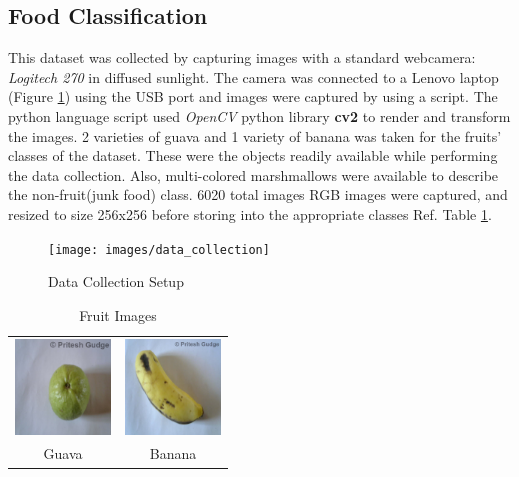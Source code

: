 \documentclass[10pt,journal,compsoc]{IEEEtran}
\begin{document}
\subsection{Food Classification}
This dataset was collected by capturing images with a standard webcamera: \emph{Logitech 270} in diffused sunlight. The camera was connected to a Lenovo laptop (Figure \ref{fig:datacoll1}) using the USB port and images were captured by using a script\cite{capt_img_script}. The python language script used \emph{OpenCV} python library \textbf{cv2} to render and transform the images. 
2 varieties of guava and 1 variety of banana was taken for the fruits' classes of the dataset. These were the objects readily available while performing the data collection. Also, multi-colored marshmallows were available to describe the non-fruit(junk food) class.  6020 total images RGB images were captured, and resized to size 256x256 before storing into the appropriate classes Ref. Table \ref{table:fruit_table}.

\begin{figure}[thpb]
      \centering
      \texttt{[image: images/data\_collection]}
      \caption{Data Collection Setup}
      \label{fig:datacoll1}
\end{figure}


\begin{table}[h]
\caption{Fruit Images}
\label{table:fruit_table}
\begin{center}
\begin{tabular}{|c|c|}
\hline
      \includegraphics[width=1in]{images/Guava__395}
 &    \includegraphics[width=1in]{images/Banana__1661}
       \\
       Guava & Banana \\
\hline
\end{tabular}
\end{center}
\end{table}


%
%
\end{document}
